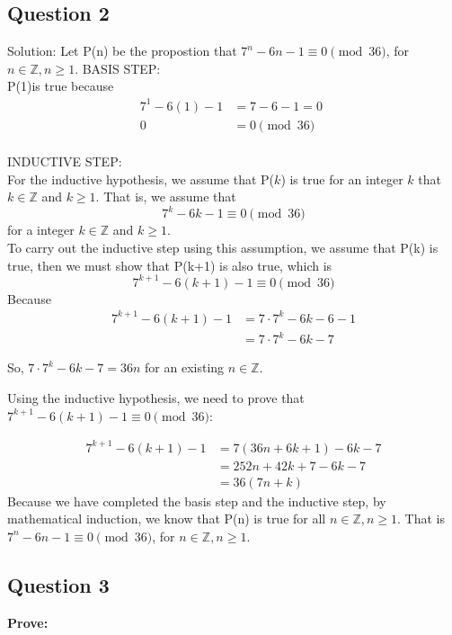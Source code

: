 \documentclass[12pt,a4paper]{article}
\begin{document}
\subsection*{Question 2}
Solution: Let P(n) be the propostion that $ 7^n - 6n - 1 \equiv 0 \pmod{36}$, for $n \in \mathbb{Z},n \geq 1$. 
BASIS STEP:\\ P(1)is true because
\begin{align*}
7^1 - 6(1) - 1 &= 7 - 6 - 1 = 0 \\
0 &= 0 \pmod{36} \quad 
\end{align*}
\\
INDUCTIVE STEP:\\
For the inductive hypothesis, we assume that P($k$) is true for an integer $k$ that $k \in \mathbb{Z} $  and $k \geq 1$. That is, we assume that
\[
7^k - 6k - 1 \equiv 0 \pmod{36}
\] for a integer $k \in \mathbb{Z}$ and $k \geq 1$.\\
To carry out the inductive step using this assumption, we assume that P(k) is true, then we must show that P(k+1) is also true, which is
\[
7^{k+1} - 6(k + 1) - 1 \equiv 0 \pmod{36}
\]
Because
\begin{align*}
7^{k+1} - 6(k + 1) - 1 &= 7 \cdot 7^k - 6k - 6 - 1 \\
&= 7 \cdot 7^k - 6k - 7
\end{align*}

So, $7 \cdot 7^k - 6k - 7 = 36n$ for an existing $n \in \mathbb{Z}$.

Using the inductive hypothesis, we need to prove that $7^{k+1} - 6(k + 1) - 1 \equiv 0 \pmod{36}$:

\begin{align*}
7^{k+1} - 6(k + 1) - 1 & = 7(36n + 6k + 1) - 6k - 7 \\
& = 252n + 42k + 7 - 6k - 7 \\
& = 36(7n + k)
\end{align*}
Because we have completed the basis step and the inductive step, by mathematical induction, we know that P(n) is true for all $n \in \mathbb{Z},n \geq 1$. That is $ 7^n - 6n - 1 \equiv 0 \pmod{36}$, for $n \in \mathbb{Z},n \geq 1$. 

\newpage
\subsection*{Question 3}

\textbf{Prove:} \\
\end{document}
